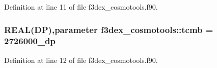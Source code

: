 Definition at line 11 of file f3dex\_\-cosmotools.f90.

\hypertarget{namespacef3dex__cosmotools_a8953fe6dc399fcf889789bee9702ee65}{
\subsubsection[{tcmb}]{\setlength{\rightskip}{0pt plus 5cm}REAL(DP),parameter {\bf f3dex\_\-cosmotools::tcmb} = 2726000\_\-dp}}
\label{namespacef3dex__cosmotools_a8953fe6dc399fcf889789bee9702ee65}


Definition at line 12 of file f3dex\_\-cosmotools.f90.

